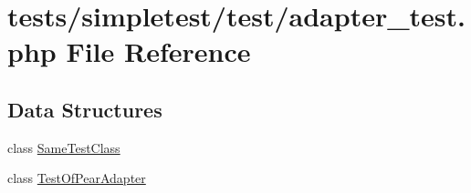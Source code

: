 \hypertarget{adapter__test_8php}{\section{tests/simpletest/test/adapter\-\_\-test.php File Reference}
\label{adapter__test_8php}
}
\subsection*{Data Structures}
\begin{DoxyCompactItemize}
\item 
class \hyperlink{class_same_test_class}{Same\-Test\-Class}
\item 
class \hyperlink{class_test_of_pear_adapter}{Test\-Of\-Pear\-Adapter}
\end{DoxyCompactItemize}

